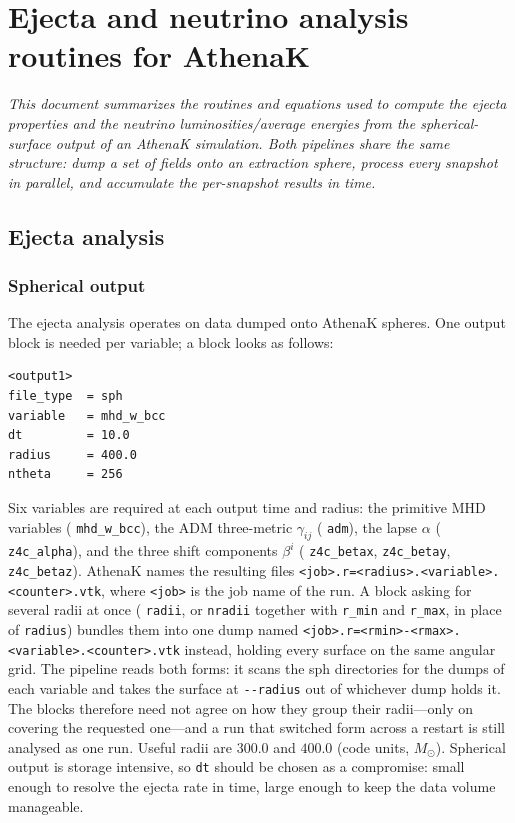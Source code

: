 \documentclass{article}
\newcommand{\var}[1]{%
  {\setlength{\fboxsep}{1.5pt}%
   \colorbox{varbg}{\textcolor{varfg}{\texttt{\small #1}}}}}
\begin{document}
\section*{Ejecta and neutrino analysis routines for AthenaK}
\textit{This document summarizes the routines and equations used to compute the
ejecta properties and the neutrino luminosities/average energies from the
spherical-surface output of an AthenaK simulation. Both pipelines share the same
structure: dump a set of fields onto an extraction sphere, process every snapshot
in parallel, and accumulate the per-snapshot results in time.}

\subsection*{Ejecta analysis}
\subsubsection*{Spherical output}
The ejecta analysis operates on data dumped onto AthenaK spheres. One output
block is needed per variable; a block looks as follows:
\begin{verbatim}
<output1>
file_type  = sph
variable   = mhd_w_bcc
dt         = 10.0
radius     = 400.0
ntheta     = 256
\end{verbatim}
Six variables are required at each output time and radius: the primitive MHD
variables (\var{mhd\_w\_bcc}), the ADM three-metric $\gamma_{ij}$ (\var{adm}),
the lapse $\alpha$ (\var{z4c\_alpha}), and the three shift components $\beta^i$
(\var{z4c\_betax}, \var{z4c\_betay}, \var{z4c\_betaz}). AthenaK names the resulting
files \var{<job>.r=<radius>.<variable>.<counter>.vtk}, where \var{<job>} is the job
name of the run. A block asking for several radii at once (\var{radii}, or
\var{nradii} together with \var{r\_min} and \var{r\_max}, in place of \var{radius})
bundles them into one dump named
\var{<job>.r=<rmin>-<rmax>.<variable>.<counter>.vtk} instead, holding every surface
on the same angular grid. The pipeline reads both forms: it scans the sph directories
for the dumps of each variable and takes the surface at \var{-{}-radius} out of
whichever dump holds it. The blocks therefore need not agree on how they group their
radii---only on covering the requested one---and a run that switched form across a
restart is still analysed as one run. Useful radii are $300.0$ and $400.0$
(code units, $M_\odot$).
Spherical output is storage intensive, so \var{dt} should be chosen as a
compromise: small enough to resolve the ejecta rate in time, large enough to
keep the data volume manageable.
\end{document}
